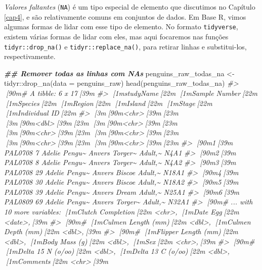 \documentclass[
]{book}
\newenvironment{Shaded}{\begin{snugshade}}{\end{snugshade}}
\newcommand{\AttributeTok}[1]{\textcolor[rgb]{0.61,0.61,0.61}{#1}}
\newcommand{\CommentTok}[1]{\textcolor[rgb]{0.37,0.37,0.37}{\textit{#1}}}
\newcommand{\DocumentationTok}[1]{\textcolor[rgb]{0.37,0.37,0.37}{\textbf{\textit{#1}}}}
\newcommand{\FunctionTok}[1]{\textcolor[rgb]{0,0,0}{#1}}
\newcommand{\NormalTok}[1]{#1}
\newcommand{\OtherTok}[1]{\textcolor[rgb]{0.37,0.37,0.37}{#1}}
\newcommand{\SpecialCharTok}[1]{\textcolor[rgb]{0,0,0}{#1}}
\begin{document}
\emph{Valores faltantes} (\texttt{NA}) é um tipo especial de elemento que discutimos no Capítulo \ref{cap4}, e são relativamente comuns em conjuntos de dados. Em Base R, vimos algumas formas de lidar com esse tipo de elemento. No formato \texttt{tidyverse}, existem várias formas de lidar com eles, mas aqui focaremos nas funções \texttt{tidyr::drop\_na()} e \texttt{tidyr::replace\_na()}, para retirar linhas e substitui-los, respectivamente.

\begin{Shaded}
\begin{Highlighting}[]
\DocumentationTok{\#\# Remover todas as linhas com NAs}
\NormalTok{penguins\_raw\_todas\_na }\OtherTok{\textless{}{-}}\NormalTok{ tidyr}\SpecialCharTok{::}\FunctionTok{drop\_na}\NormalTok{(}\AttributeTok{data =}\NormalTok{ penguins\_raw)}
\FunctionTok{head}\NormalTok{(penguins\_raw\_todas\_na)}
\CommentTok{\#\textgreater{} [90m\# A tibble: 6 x 17[39m}
\CommentTok{\#\textgreater{}   [1mstudyName[22m [1m\textasciigrave{}Sample Number\textasciigrave{}[22m [1mSpecies[22m       [1mRegion[22m [1mIsland[22m  [1mStage[22m   [1m\textasciigrave{}Individual ID\textasciigrave{}[22m}
\CommentTok{\#\textgreater{}   [3m[90m\textless{}chr\textgreater{}[39m[23m               [3m[90m\textless{}dbl\textgreater{}[39m[23m [3m[90m\textless{}chr\textgreater{}[39m[23m         [3m[90m\textless{}chr\textgreater{}[39m[23m  [3m[90m\textless{}chr\textgreater{}[39m[23m   [3m[90m\textless{}chr\textgreater{}[39m[23m   [3m[90m\textless{}chr\textgreater{}[39m[23m          }
\CommentTok{\#\textgreater{} [90m1[39m PAL0708                 7 Adelie Pengu\textasciitilde{} Anvers Torger\textasciitilde{} Adult,\textasciitilde{} N4A1           }
\CommentTok{\#\textgreater{} [90m2[39m PAL0708                 8 Adelie Pengu\textasciitilde{} Anvers Torger\textasciitilde{} Adult,\textasciitilde{} N4A2           }
\CommentTok{\#\textgreater{} [90m3[39m PAL0708                29 Adelie Pengu\textasciitilde{} Anvers Biscoe  Adult,\textasciitilde{} N18A1          }
\CommentTok{\#\textgreater{} [90m4[39m PAL0708                30 Adelie Pengu\textasciitilde{} Anvers Biscoe  Adult,\textasciitilde{} N18A2          }
\CommentTok{\#\textgreater{} [90m5[39m PAL0708                39 Adelie Pengu\textasciitilde{} Anvers Dream   Adult,\textasciitilde{} N25A1          }
\CommentTok{\#\textgreater{} [90m6[39m PAL0809                69 Adelie Pengu\textasciitilde{} Anvers Torger\textasciitilde{} Adult,\textasciitilde{} N32A1          }
\CommentTok{\#\textgreater{} [90m\# ... with 10 more variables: [1mClutch Completion[22m \textless{}chr\textgreater{}, [1mDate Egg[22m \textless{}date\textgreater{},[39m}
\CommentTok{\#\textgreater{} [90m\#   [1mCulmen Length (mm)[22m \textless{}dbl\textgreater{}, [1mCulmen Depth (mm)[22m \textless{}dbl\textgreater{},[39m}
\CommentTok{\#\textgreater{} [90m\#   [1mFlipper Length (mm)[22m \textless{}dbl\textgreater{}, [1mBody Mass (g)[22m \textless{}dbl\textgreater{}, [1mSex[22m \textless{}chr\textgreater{},[39m}
\CommentTok{\#\textgreater{} [90m\#   [1mDelta 15 N (o/oo)[22m \textless{}dbl\textgreater{}, [1mDelta 13 C (o/oo)[22m \textless{}dbl\textgreater{}, [1mComments[22m \textless{}chr\textgreater{}[39m}


\end{Highlighting}
\end{Shaded}
\end{document}
